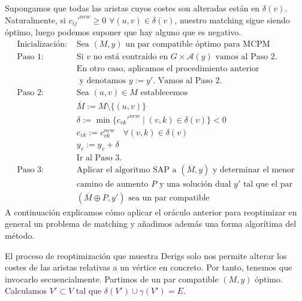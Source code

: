 \documentclass[twoside,a4paper,openright,12pt]{book}
\begin{document}
Supongamos que todas las aristas cuyos costes son alteradas están en $\delta(v)$. Naturalmente, si $c_{ij}'^{new} \geq 0$ $\forall (u,v) \in \delta(v)$, nuestro matching sigue siendo óptimo, luego podemos suponer que hay alguno que es negativo.
\begin{align*}
\text{Inicialización: }& \text{Sea $(M,y)$ un par compatible óptimo para MCPM}\\
\text{Paso 1: }& \text{Si $v$ no está contraído en $G\times \mathcal{A}(y)$ vamos al Paso 2.}\\
&\text{En otro caso, aplicamos el procedimiento anterior}\\
&\text{ y denotamos $y:=y'$. Vamos al Paso 2.}\\
\text{Paso 2: }& \text{Sea $(u,v) \in M$ establecemos}\\
&\overline{M}:=M\setminus\{(u,v)\}\\
&\delta:=\min\{c_{vk}'^{new}\mid (v,k)\in \delta(v)\}<0\\
&c_{vk}:=c_{vk}^{new} \quad \forall (v,k)\in \delta (v)\\
&y_v:=y_v+\delta\\
&\text{Ir al Paso 3.}\\
\text{Paso 3: }&\text{Aplicar el algoritmo SAP a $(\overline{M},y)$ y determinar el menor}\\
&\text{camino de aumento $P$ y una solución dual $y'$ tal que el par}\\
&\text{$(\overline{M}\oplus P,y')$ sea un par compatible}
\end{align*}
A continuación explicamos cómo aplicar el oráculo anterior para reoptimizar en general un problema de matching y añadimos además una forma algorítima del método.

El proceso de reoptimización que muestra Derigs solo nos permite alterar los costes de las aristas relativas a un vértice en concreto. Por tanto, tenemos que invocarlo secuencialmente. Partimos de un par compatible $(M,y)$ óptimo. Calculamos $V' \subset V$ tal que $\delta(V') \cup \gamma(V')= E$. 	
\end{document}
